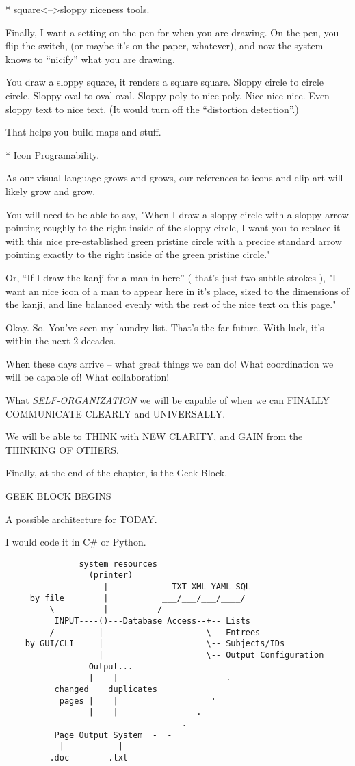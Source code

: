 \documentclass[oneside]{scrbook}
\begin{document}
* square<-->sloppy niceness tools.

Finally, I want a setting on the pen for when you are drawing. On the
pen, you flip the switch, (or maybe it's on the paper, whatever), and
now the system knows to ``nicify'' what you are drawing.

You draw a sloppy square, it renders a square square. Sloppy circle to
circle circle. Sloppy oval to oval oval. Sloppy poly to nice
poly. Nice nice nice. Even sloppy text to nice text. (It would turn
off the ``distortion detection''.)

That helps you build maps and stuff.

* Icon Programability.

As our visual language grows and grows, our references to icons and
clip art will likely grow and grow.

You will need to be able to say, "When I draw a sloppy circle with a
sloppy arrow pointing roughly to the right inside of the sloppy
circle, I want you to replace it with this nice pre-established green
pristine circle with a precice standard arrow pointing exactly to the
right inside of the green pristine circle."

Or, ``If I draw the kanji for a man in here'' (-that's just two subtle
strokes-), "I want an nice icon of a man to appear here in it's place,
sized to the dimensions of the kanji, and line balanced evenly with
the rest of the nice text on this page."

Okay. So.
You've seen my laundry list.
That's the far future. With luck, it's within the next 2 decades.

When these days arrive -- what great things we can do! What coordination
we will be capable of! What collaboration!

What \emph{SELF-ORGANIZATION} we will be capable of when we can FINALLY
COMMUNICATE CLEARLY and UNIVERSALLY.

We will be able to THINK with NEW CLARITY, and GAIN from the THINKING
OF OTHERS.

Finally, at the end of the chapter, is the Geek Block.

GEEK BLOCK BEGINS

A possible architecture for TODAY.

I would code it in C\# or Python.

\begin{verbatim}
               system resources
                 (printer)
                    |             TXT XML YAML SQL
     by file        |           ___/___/___/____/
         \          |          /
          INPUT----()---Database Access--+-- Lists
         /         |                     \-- Entrees
    by GUI/CLI     |                     \-- Subjects/IDs
                   |                     \-- Output Configuration
                 Output...
                 |    |                      .
          changed    duplicates
           pages |    |                   '
                 |    |                .
         --------------------       .
          Page Output System  -  -
           |           |
         .doc        .txt
\end{verbatim}
\end{document}
